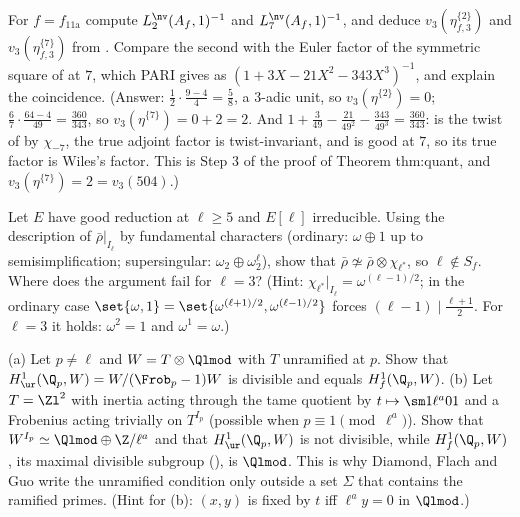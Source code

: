 \begin{exercise}\label{ex:congruence:ex-factor-11a}
For $f=f_{\text{11a}}$ compute $L^{\nv}_2(A_f,1)^{-1}$ and $L^{\nv}_7(A_f,1)^{-1}$, and deduce $v_3(\eta^{\{2\}}_{f,3})$ and $v_3(\eta^{\{7\}}_{f,3})$ from . Compare the second with the Euler factor
of the symmetric square of  at $7$, which PARI gives as $(1+3X-21X^2-343X^3)^{-1}$, and explain the coincidence. (Answer: $\frac12\cdot\frac{9-4}{4}=\frac58$, a $3$-adic unit, so
$v_3(\eta^{\{2\}})=0$; $\frac67\cdot\frac{64-4}{49}=\frac{360}{343}$, so $v_3(\eta^{\{7\}})=0+2=2$. And $1+\frac3{49}-\frac{21}{49^2}-\frac{343}{49^3}=\frac{360}{343}$:  is the twist of  by $\chi_{-7}$, the true adjoint
factor is twist-invariant, and  is good at $7$, so its true factor is Wiles's factor. This is Step 3 of the proof of Theorem thm:quant, and $v_3(\eta^{\{7\}})=2=v_3(504)$.)
\end{exercise}

\begin{exercise}\label{ex:congruence:ex-sf}
Let $E$ have good reduction at $\ell\ge5$ and $E[\ell]$ irreducible. Using the description of $\bar\rho|_{I_\ell}$ by fundamental characters (ordinary: $\omega\oplus1$ up to semisimplification; supersingular:
$\omega_2\oplus\omega_2^\ell$), show that $\bar\rho\not\simeq\bar\rho\otimes\chi_{\ell^*}$, so $\ell\notin S_f$. Where does the argument fail for $\ell=3$? (Hint: $\chi_{\ell^*}|_{I_\ell}=\omega^{(\ell-1)/2}$; in the ordinary case
$\set{\omega,1}=\set{\omega^{(\ell+1)/2},\omega^{(\ell-1)/2}}$ forces $(\ell-1)\mid\frac{\ell+1}2$. For $\ell=3$ it holds: $\omega^2=1$ and $\omega^{1}=\omega$.)
\end{exercise}

\begin{exercise}\label{ex:congruence:ex-hur}
(a) Let $p\ne\ell$ and $W=T\otimes\Qlmod$ with $T$ unramified at $p$. Show that $H^1_{\ur}(\Q_p,W)=W/(\Frob_p-1)W$ is divisible and equals $H^1_f(\Q_p,W)$. (b) Let $T=\Zl^2$ with inertia acting through the
tame quotient by $t\mapsto\sm1{\ell^a}01$ and a Frobenius acting trivially on $T^{I_p}$ (possible when $p\equiv1\pmod{\ell^a}$). Show that $W^{I_p}\simeq\Qlmod\oplus\Z/\ell^a$ and that $H^1_{\ur}(\Q_p,W)$ is not divisible,
while $H^1_f(\Q_p,W)$, its maximal divisible subgroup (), is $\Qlmod$. This is why Diamond, Flach and Guo write the unramified condition only outside a set $\Sigma$ that contains the
ramified primes. (Hint for (b): $(x,y)$ is fixed by $t$ iff $\ell^ay=0$ in $\Qlmod$.)
\end{exercise}

